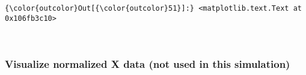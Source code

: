 \documentclass{article}
\begin{document}
            \begin{Verbatim}[commandchars=\\\{\}]
{\color{outcolor}Out[{\color{outcolor}51}]:} <matplotlib.text.Text at 0x106fb3c10>
\end{Verbatim}
        
    \begin{center}
    \end{center}
    { \hspace*{\fill} \\}
    
    \subsubsection{Visualize normalized X data (not used in this
simulation)}\label{visualize-normalized-x-data-not-used-in-this-simulation}
\end{document}

